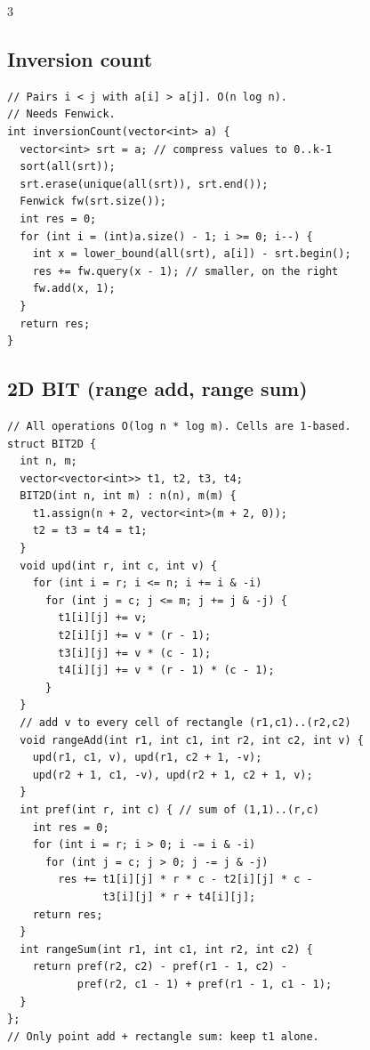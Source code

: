 \documentclass[8pt, a4paper]{article}
\begin{document}
\begin{multicols*}{3}
\subsection{Inversion count}
\begin{lstlisting}
// Pairs i < j with a[i] > a[j]. O(n log n).
// Needs Fenwick.
int inversionCount(vector<int> a) {
  vector<int> srt = a; // compress values to 0..k-1
  sort(all(srt));
  srt.erase(unique(all(srt)), srt.end());
  Fenwick fw(srt.size());
  int res = 0;
  for (int i = (int)a.size() - 1; i >= 0; i--) {
    int x = lower_bound(all(srt), a[i]) - srt.begin();
    res += fw.query(x - 1); // smaller, on the right
    fw.add(x, 1);
  }
  return res;
}
\end{lstlisting}
\subsection{2D BIT (range add, range sum)}
\begin{lstlisting}
// All operations O(log n * log m). Cells are 1-based.
struct BIT2D {
  int n, m;
  vector<vector<int>> t1, t2, t3, t4;
  BIT2D(int n, int m) : n(n), m(m) {
    t1.assign(n + 2, vector<int>(m + 2, 0));
    t2 = t3 = t4 = t1;
  }
  void upd(int r, int c, int v) {
    for (int i = r; i <= n; i += i & -i)
      for (int j = c; j <= m; j += j & -j) {
        t1[i][j] += v;
        t2[i][j] += v * (r - 1);
        t3[i][j] += v * (c - 1);
        t4[i][j] += v * (r - 1) * (c - 1);
      }
  }
  // add v to every cell of rectangle (r1,c1)..(r2,c2)
  void rangeAdd(int r1, int c1, int r2, int c2, int v) {
    upd(r1, c1, v), upd(r1, c2 + 1, -v);
    upd(r2 + 1, c1, -v), upd(r2 + 1, c2 + 1, v);
  }
  int pref(int r, int c) { // sum of (1,1)..(r,c)
    int res = 0;
    for (int i = r; i > 0; i -= i & -i)
      for (int j = c; j > 0; j -= j & -j)
        res += t1[i][j] * r * c - t2[i][j] * c -
               t3[i][j] * r + t4[i][j];
    return res;
  }
  int rangeSum(int r1, int c1, int r2, int c2) {
    return pref(r2, c2) - pref(r1 - 1, c2) -
           pref(r2, c1 - 1) + pref(r1 - 1, c1 - 1);
  }
};
// Only point add + rectangle sum: keep t1 alone.
\end{lstlisting}

\end{multicols*}
\end{document}
